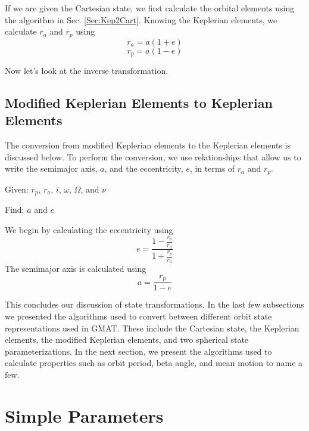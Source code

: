 If we are given the Cartesian state, we first calculate the
orbital elements using the algorithm in Sec. \ref{Sec:Kep2Cart}.
Knowing the Keplerian elements, we calculate $r_a$ and $r_p$ using
%
\begin{equation}
     r_a = a(1+e)
\end{equation}
%
\begin{equation}
     r_p = a(1-e)
\end{equation}

Now let's look at the inverse transformation.

\subsection{Modified Keplerian Elements to Keplerian Elements}    

The conversion from modified Keplerian elements to the Keplerian
elements is discussed below.  To perform the conversion, we use
relationships that allow us to write the semimajor axis, $a$, and
the eccentricity, $e$, in terms of $r_a$ and $r_p$.

\noindent Given:  $r_p$, $r_a$, $i$, $\omega$, $\Omega$, and $\nu$

\noindent Find:  $a$ and $e$

We begin by calculating the eccentricity using
%
\begin{equation}
    e = \frac{1 - \displaystyle\frac{r_p}{r_a}}{1 + \displaystyle\frac{r_p}{r_a}}
\end{equation}
%
The semimajor axis is calculated using
%
\begin{equation}
    a = \displaystyle\frac{r_p}{1 - e}
\end{equation}

This concludes our discussion of state transformations. In the
last few subsections we presented the algorithms used to convert
between different orbit state representations used in GMAT.  These
include the Cartesian state, the Keplerian elements, the modified
Keplerian elements, and two spherical state parameterizations.  In
the next section, we present the algorithms used to calculate
 properties such as orbit period, beta angle, and mean motion to
 name a few.

\section{Simple Parameters}

